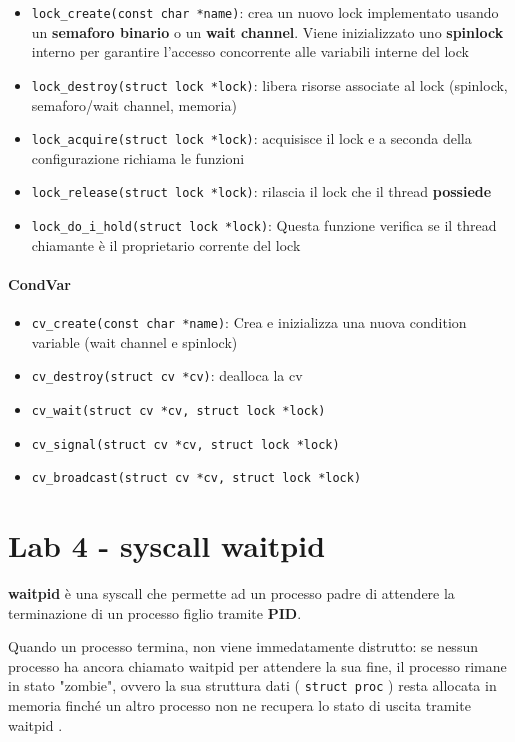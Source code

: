 \begin{itemize}
  \item \verb|lock_create(const char *name)|: crea un nuovo lock implementato usando un \textbf{semaforo binario} o un \textbf{wait channel}. Viene inizializzato uno \textbf{spinlock} interno per garantire l'accesso concorrente alle variabili interne del lock
  \item \verb|lock_destroy(struct lock *lock)|: libera risorse associate al lock (spinlock, semaforo/wait channel, memoria)
  \item \verb|lock_acquire(struct lock *lock)|: acquisisce il lock e a seconda della configurazione richiama le funzioni
  \item \verb|lock_release(struct lock *lock)|: rilascia il lock che il thread \textbf{possiede}
  \item \verb|lock_do_i_hold(struct lock *lock)|: Questa funzione verifica se il thread chiamante è il proprietario corrente del lock
\end{itemize}

\paragraph{CondVar}

\begin{itemize}
  \item \verb|cv_create(const char *name)|: Crea e inizializza una nuova condition variable (wait channel e spinlock)
  \item \verb|cv_destroy(struct cv *cv)|: dealloca la cv
  \item \verb|cv_wait(struct cv *cv, struct lock *lock)|
  \item \verb|cv_signal(struct cv *cv, struct lock *lock)|
  \item \verb|cv_broadcast(struct cv *cv, struct lock *lock)|
\end{itemize}

\section{Lab 4 - syscall waitpid}

\textbf{waitpid} è una syscall che permette ad un processo padre di attendere la terminazione di un processo figlio tramite \textbf{PID}.

Quando un processo termina, non viene immedatamente distrutto: se nessun processo ha ancora chiamato waitpid
per attendere la sua fine, il processo rimane in stato "zombie", ovvero la sua
struttura dati ( \verb|struct proc| ) resta allocata in memoria finché un altro processo non
ne recupera lo stato di uscita tramite waitpid .





